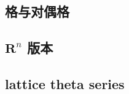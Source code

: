 

\subsection{格与对偶格}
\label{b2:subsec:060401}

\subsection{\texorpdfstring{\(\mathbf R^n\)}{m} 版本}
\label{b2:subsec:060402}

\subsection{lattice theta series}
\label{b2:subsec:060403}


